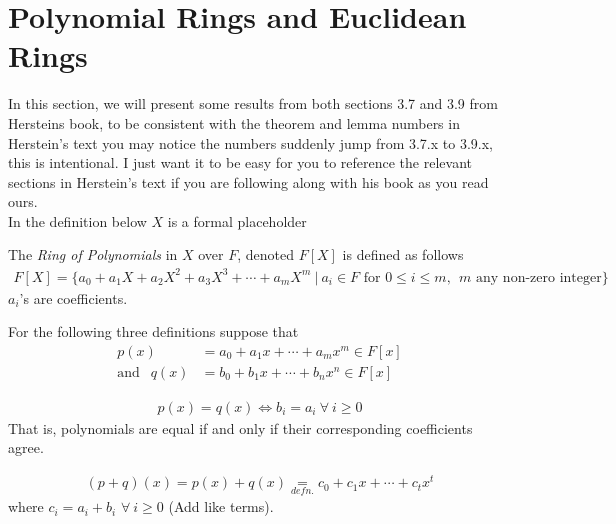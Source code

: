 \section{Polynomial Rings and Euclidean Rings}
In this section,  we will present some results from both sections 3.7 and 3.9 from Hersteins book, to be consistent with the theorem and lemma numbers in Herstein's text you may notice the numbers suddenly jump from 3.7.x to 3.9.x, this is intentional. I just want it to be easy for you to reference the relevant sections in Herstein's text if you are following along with his book as you read ours. \\
\newpage 
\noindent In the definition below $X$ is a formal placeholder
\begin{definition}
    The \textit{Ring of Polynomials} in $X$ over $F$, denoted $F[X]$ is defined as follows
    \begin{align}
        F[X]= \{a_0 + a_1X + a_2X^2 + a_3X^3 + \cdots + a_m X^m \ | \ a_i \in F \text{ for } 0\leq i \leq m, \ \ m \text{ any non-zero integer}\} \nonumber
    \end{align}
    $a_i$'s are coefficients.
\end{definition}

\noindent For the following three definitions suppose that
\begin{align}
    p(x)&= a_0 + a_1x + \cdots + a_mx^m \in F[x] \nonumber \\
    \text{and } \ \ q(x)&= b_0+b_1x+\cdots + b_n x^n \in F[x] \nonumber
\end{align}

\begin{definition}
    \begin{align}
        p(x)=q(x) \iff b_i = a_i \ \forall \ i \geq 0 \nonumber 
    \end{align}
    That is, polynomials are equal if and only if their corresponding coefficients agree.
\end{definition}

\begin{definition}
    \begin{align}
        (p+q)(x)= p(x)+q(x) \underset{defn.}{=}c_0 + c_1x + \cdots + c_t x^t \nonumber
    \end{align}
    where $c_i = a_i+b_i$ $\forall \ i\geq 0$ (Add like terms).
\end{definition}

